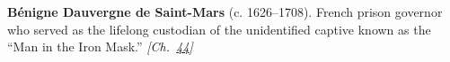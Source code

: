 \textbf{Bénigne Dauvergne de Saint-Mars} (c. 1626–1708). French prison governor who served as the lifelong custodian of the unidentified captive known as the ``Man in the Iron Mask.'' \emph{[Ch.~\hyperref[ch:ironmask]{44}]}

